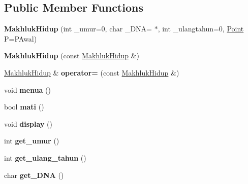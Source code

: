\subsection*{Public Member Functions}
\begin{DoxyCompactItemize}
\item 
{\bfseries Makhluk\+Hidup} (int \+\_\+umur=0, char \+\_\+\+D\+NA= \textquotesingle{}$\ast$\textquotesingle{}, int \+\_\+ulangtahun=0, \hyperlink{class_point}{Point} P=P\+Awal)\hypertarget{class_makhluk_hidup_aa2b7d6507df43a37523592ae194cc30f}{}\label{class_makhluk_hidup_aa2b7d6507df43a37523592ae194cc30f}

\item 
{\bfseries Makhluk\+Hidup} (const \hyperlink{class_makhluk_hidup}{Makhluk\+Hidup} \&)\hypertarget{class_makhluk_hidup_ab4caed894c2ae2ab388ce59b0b5311d9}{}\label{class_makhluk_hidup_ab4caed894c2ae2ab388ce59b0b5311d9}

\item 
\hyperlink{class_makhluk_hidup}{Makhluk\+Hidup} \& {\bfseries operator=} (const \hyperlink{class_makhluk_hidup}{Makhluk\+Hidup} \&)\hypertarget{class_makhluk_hidup_a372abdbd24705c1edd3661436947fe22}{}\label{class_makhluk_hidup_a372abdbd24705c1edd3661436947fe22}

\item 
void {\bfseries menua} ()\hypertarget{class_makhluk_hidup_ae06db2e59854f4cd51aae77ea177405e}{}\label{class_makhluk_hidup_ae06db2e59854f4cd51aae77ea177405e}

\item 
bool {\bfseries mati} ()\hypertarget{class_makhluk_hidup_a5fe3d9e2262f499bbb1369cadf252d5c}{}\label{class_makhluk_hidup_a5fe3d9e2262f499bbb1369cadf252d5c}

\item 
void {\bfseries display} ()\hypertarget{class_makhluk_hidup_a5f680398fc4ad2f630b317695e9d4a4f}{}\label{class_makhluk_hidup_a5f680398fc4ad2f630b317695e9d4a4f}

\item 
int {\bfseries get\+\_\+umur} ()\hypertarget{class_makhluk_hidup_a05e688885d0a194c53412ef8c8f04890}{}\label{class_makhluk_hidup_a05e688885d0a194c53412ef8c8f04890}

\item 
int {\bfseries get\+\_\+ulang\+\_\+tahun} ()\hypertarget{class_makhluk_hidup_a4077d7a2a0f0a84858b15dadd181d945}{}\label{class_makhluk_hidup_a4077d7a2a0f0a84858b15dadd181d945}

\item 
char {\bfseries get\+\_\+\+D\+NA} ()\hypertarget{class_makhluk_hidup_a67f74ca50e81ff549d6b2c6a7cfcbba7}{}\label{class_makhluk_hidup_a67f74ca50e81ff549d6b2c6a7cfcbba7}


\end{DoxyCompactItemize}
